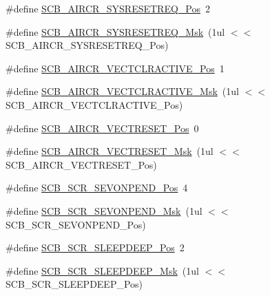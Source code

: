 \begin{DoxyCompactItemize}
\#define \mbox{\hyperlink{group___c_m_s_i_s___c_m3___s_c_b_gaffb2737eca1eac0fc1c282a76a40953c}{S\+C\+B\+\_\+\+A\+I\+R\+C\+R\+\_\+\+S\+Y\+S\+R\+E\+S\+E\+T\+R\+E\+Q\+\_\+\+Pos}}~2
\item 
\#define \mbox{\hyperlink{group___c_m_s_i_s___c_m3___s_c_b_gaae1181119559a5bd36e62afa373fa720}{S\+C\+B\+\_\+\+A\+I\+R\+C\+R\+\_\+\+S\+Y\+S\+R\+E\+S\+E\+T\+R\+E\+Q\+\_\+\+Msk}}~(1ul $<$$<$ S\+C\+B\+\_\+\+A\+I\+R\+C\+R\+\_\+\+S\+Y\+S\+R\+E\+S\+E\+T\+R\+E\+Q\+\_\+\+Pos)
\item 
\#define \mbox{\hyperlink{group___c_m_s_i_s___c_m3___s_c_b_gaa30a12e892bb696e61626d71359a9029}{S\+C\+B\+\_\+\+A\+I\+R\+C\+R\+\_\+\+V\+E\+C\+T\+C\+L\+R\+A\+C\+T\+I\+V\+E\+\_\+\+Pos}}~1
\item 
\#define \mbox{\hyperlink{group___c_m_s_i_s___c_m3___s_c_b_ga212c5ab1c1c82c807d30d2307aa8d218}{S\+C\+B\+\_\+\+A\+I\+R\+C\+R\+\_\+\+V\+E\+C\+T\+C\+L\+R\+A\+C\+T\+I\+V\+E\+\_\+\+Msk}}~(1ul $<$$<$ S\+C\+B\+\_\+\+A\+I\+R\+C\+R\+\_\+\+V\+E\+C\+T\+C\+L\+R\+A\+C\+T\+I\+V\+E\+\_\+\+Pos)
\item 
\#define \mbox{\hyperlink{group___c_m_s_i_s___c_m3___s_c_b_ga0d483d9569cd9d1b46ec0d171b1f18d8}{S\+C\+B\+\_\+\+A\+I\+R\+C\+R\+\_\+\+V\+E\+C\+T\+R\+E\+S\+E\+T\+\_\+\+Pos}}~0
\item 
\#define \mbox{\hyperlink{group___c_m_s_i_s___c_m3___s_c_b_ga3006e31968bb9725e7b4ee0784d99f7f}{S\+C\+B\+\_\+\+A\+I\+R\+C\+R\+\_\+\+V\+E\+C\+T\+R\+E\+S\+E\+T\+\_\+\+Msk}}~(1ul $<$$<$ S\+C\+B\+\_\+\+A\+I\+R\+C\+R\+\_\+\+V\+E\+C\+T\+R\+E\+S\+E\+T\+\_\+\+Pos)
\item 
\#define \mbox{\hyperlink{group___c_m_s_i_s___c_m3___s_c_b_ga3bddcec40aeaf3d3a998446100fa0e44}{S\+C\+B\+\_\+\+S\+C\+R\+\_\+\+S\+E\+V\+O\+N\+P\+E\+N\+D\+\_\+\+Pos}}~4
\item 
\#define \mbox{\hyperlink{group___c_m_s_i_s___c_m3___s_c_b_gafb98656644a14342e467505f69a997c9}{S\+C\+B\+\_\+\+S\+C\+R\+\_\+\+S\+E\+V\+O\+N\+P\+E\+N\+D\+\_\+\+Msk}}~(1ul $<$$<$ S\+C\+B\+\_\+\+S\+C\+R\+\_\+\+S\+E\+V\+O\+N\+P\+E\+N\+D\+\_\+\+Pos)
\item 
\#define \mbox{\hyperlink{group___c_m_s_i_s___c_m3___s_c_b_gab304f6258ec03bd9a6e7a360515c3cfe}{S\+C\+B\+\_\+\+S\+C\+R\+\_\+\+S\+L\+E\+E\+P\+D\+E\+E\+P\+\_\+\+Pos}}~2
\item 
\#define \mbox{\hyperlink{group___c_m_s_i_s___c_m3___s_c_b_ga77c06a69c63f4b3f6ec1032e911e18e7}{S\+C\+B\+\_\+\+S\+C\+R\+\_\+\+S\+L\+E\+E\+P\+D\+E\+E\+P\+\_\+\+Msk}}~(1ul $<$$<$ S\+C\+B\+\_\+\+S\+C\+R\+\_\+\+S\+L\+E\+E\+P\+D\+E\+E\+P\+\_\+\+Pos)
\item 
$$
\end{DoxyCompactItemize}
